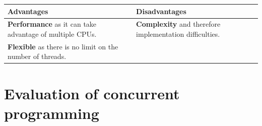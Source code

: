 \documentclass[a4paper]{systems-software}
\begin{document}
\begin{longtabu} to \textwidth {|X[1,l]|X[1,l]|}
    \hline
    \textbf{Advantages} & \textbf{Disadvantages}
    \\ \hline
    \textbf{Performance} as it can take advantage of multiple CPUs.
    &
    \textbf{Complexity} and therefore implementation difficulties.
    \\ \hline
    \textbf{Flexible} as there is no limit on the number of threads.
    &
	\\ \hline
\end{longtabu}


\newpage

\section{Evaluation of concurrent programming}
\end{document}
